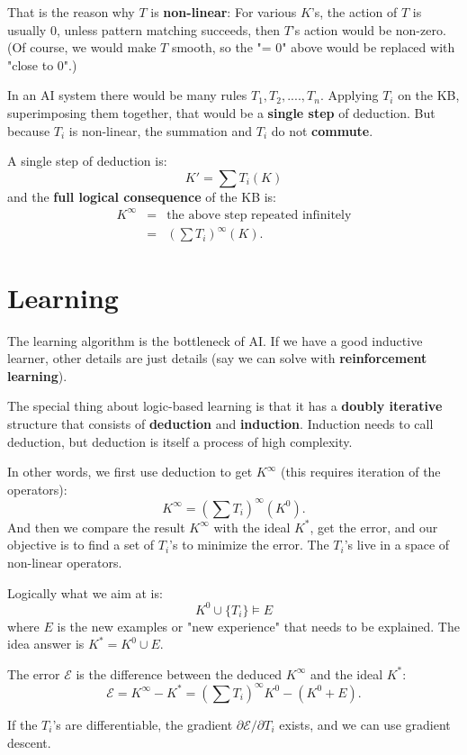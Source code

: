 \documentclass[12pt]{article}
\begin{document}
That is the reason why $T$ is \textbf{non-linear}:  For various $K$'s, the action of $T$ is usually 0, unless pattern matching succeeds, then $T$'s action would be non-zero.  (Of course, we would make $T$ smooth, so the "= 0" above would be replaced with "close to 0".)

In an AI system there would be many rules $T_1, T_2, ...., T_n$.  Applying $T_i$ on the KB, superimposing them together, that would be a \textbf{single step} of deduction.  But because $T_i$ is non-linear, the summation and $T_i$ do not \textbf{commute}.

A single step of deduction is:
     $$ K' = \sum T_i (K) $$
and the \textbf{full logical consequence} of the KB is:
\begin{eqnarray} \nonumber
K^\infty & = & \mbox{the above step repeated infinitely} \\ \nonumber
         & = &  (\sum T_i) ^\infty (K) .
\end{eqnarray}

\section{Learning}

The learning algorithm is the bottleneck of AI.  If we have a good inductive learner, other details are just details (say we can solve with \textbf{reinforcement learning}).

The special thing about logic-based learning is that it has a \textbf{doubly iterative} structure that consists of \textbf{deduction} and \textbf{induction}.  Induction needs to call deduction, but deduction is itself a process of high complexity.

In other words, we first use deduction to get $K^\infty$ (this requires iteration of the operators):
$$ K^\infty = (\sum T_i) ^\infty (K^0) .$$
And then we compare the result $K^\infty$ with the ideal $K^*$, get the error, and our objective is to find a set of $T_i$'s to minimize the error.  The $T_i$'s live in a space of non-linear operators.

Logically what we aim at is:
$$ K^0 \cup \{ T_i \} \models E $$
where $E$ is the new examples or "new experience" that needs to be explained.  The idea answer is $K^* = K^0 \cup E$.

The error $\mathcal{E}$ is the difference between the deduced $K^\infty$ and the ideal $K^*$:
$$ \mathcal{E} = K^\infty - K^* = (\sum T_i) ^\infty K^0 - (K^0 + E) . $$

If the $T_i$'s are differentiable, the gradient $\partial\mathcal{E}/\partial T_i$ exists, and we can use gradient descent.
\end{document}
